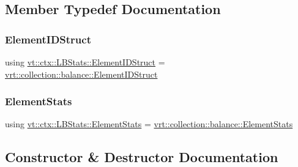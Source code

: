\subsection{Member Typedef Documentation}
\mbox{\label{structvt_1_1ctx_1_1_l_b_stats_a9806d27212bffbbac72eb1e05f9e9880}} 
\subsubsection{\texorpdfstring{Element\+I\+D\+Struct}{ElementIDStruct}}
{\footnotesize\ttfamily using \hyperlink{structvt_1_1ctx_1_1_l_b_stats_a9806d27212bffbbac72eb1e05f9e9880}{vt\+::ctx\+::\+L\+B\+Stats\+::\+Element\+I\+D\+Struct} =  \hyperlink{structvt_1_1vrt_1_1collection_1_1balance_1_1_element_i_d_struct}{vrt\+::collection\+::balance\+::\+Element\+I\+D\+Struct}}

\mbox{\label{structvt_1_1ctx_1_1_l_b_stats_aaf24fff3db7252f70df0a02e12966eb4}} 
\subsubsection{\texorpdfstring{Element\+Stats}{ElementStats}}
{\footnotesize\ttfamily using \hyperlink{structvt_1_1ctx_1_1_l_b_stats_aaf24fff3db7252f70df0a02e12966eb4}{vt\+::ctx\+::\+L\+B\+Stats\+::\+Element\+Stats} =  \hyperlink{structvt_1_1vrt_1_1collection_1_1balance_1_1_element_stats}{vrt\+::collection\+::balance\+::\+Element\+Stats}}



\subsection{Constructor \& Destructor Documentation}
\mbox{\label{structvt_1_1ctx_1_1_l_b_stats_aa1212c9a206b738a146981acbc48327d}} 

